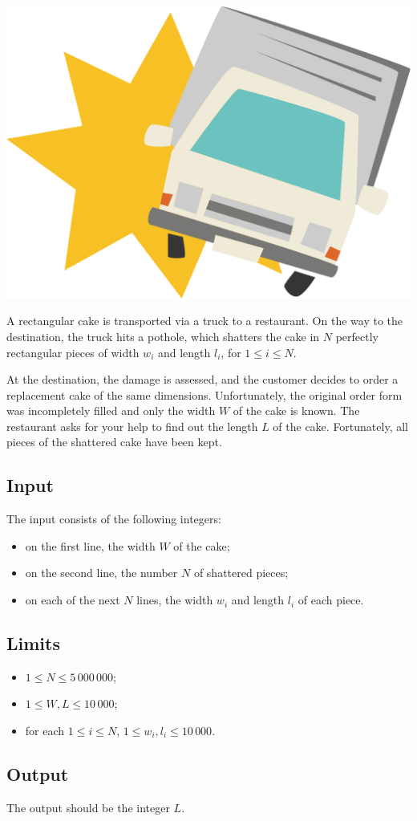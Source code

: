 
{\centering\includegraphics[width=.4\linewidth]{truck}\par}

\medskip

\noindent
A rectangular cake is transported via a truck to a
restaurant. On the way to the destination, the truck hits a pothole,
which shatters
the cake in $N$ perfectly rectangular pieces of width $w_i$ and length $l_i$, for
$1\leqslant i\leqslant N$.

At the destination, the damage is assessed, and the customer decides to
order a replacement cake of the same dimensions. Unfortunately, the original order form was
incompletely filled and only the width $W$ of the cake is known. 
The restaurant asks for your help
to find out the length $L$ of the cake. Fortunately, all pieces of the
shattered cake have been kept.

\subsection*{Input}

The input consists of the following integers:
\begin{itemize}
\item on the first line, the width $W$ of the cake;
\item on the second line, the number $N$ of shattered pieces;
\item on each of the next $N$ lines, the width $w_i$ and length $l_i$ of each piece.
\end{itemize}

\subsection*{Limits}
\begin{itemize}
\item $1\leqslant N\leqslant 5\,000\,000$;
\item $1\leqslant W,L \leqslant 10\,000$;
\item for each $1\leq i\leq N$, $1\leqslant w_i,l_i \leqslant 10\,000$.
\end{itemize}

\subsection*{Output}

The output should be the integer $L$.

\clearpage
